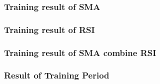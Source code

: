\documentclass[../Experiment Result.tex]{subfiles}
\begin{document}
\subsubsection{Training result of SMA}


\subsubsection{Training result of RSI}


\subsubsection{Training result of SMA combine RSI}


\subsubsection{Result of Training Period}
\end{document}
